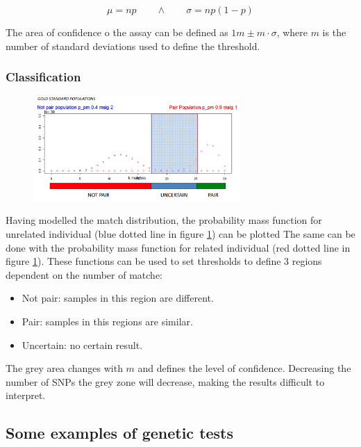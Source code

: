 	$$\mu = np\qquad\land\qquad \sigma = np(1-p)$$

	The area of confidence o the assay can be defined as $1m\pm m\cdot \sigma$, where $m$ is the number of standard deviations used to define the threshold.

		\subsubsection{Classification}

		\begin{figure}[H]
			\centering
			\includegraphics[width=0.7\textwidth]{double_test.PNG}
			\caption{}
			\label{fig:prob_test}
		\end{figure}

		Having modelled the match distribution, the probability mass function for unrelated individual (blue dotted line in figure \ref{fig:prob_test}) can be plotted
		The same can be done with the probability mass function for related individual (red dotted line in figure \ref{fig:prob_test}).
		These functions can be used to set thresholds to define $3$ regions dependent on the number of matche:

		\begin{multicols}{3}
			\begin{itemize}
				\item Not pair: samples in this region are different.
				\item Pair: samples in this regions are similar.
				\item Uncertain: no certain result.
			\end{itemize}
		\end{multicols}

		The grey area changes with $m$ and defines the level of confidence.
		Decreasing the number of SNPs the grey zone will decrease, making the results difficult to interpret.

	\subsection{Some examples of genetic tests}

